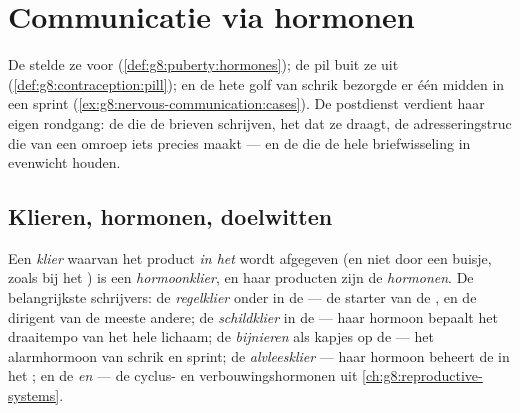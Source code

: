 \chapter{Communicatie via hormonen}\label{ch:g8:hormonal-communication}

De  stelde ze voor
(\cref{def:g8:puberty:hormones}); de pil buit ze uit
(\cref{def:g8:contraception:pill}); en de hete golf van schrik bezorgde er
één midden in een sprint
(\cref{ex:g8:nervous-communication:cases}). De postdienst verdient haar
eigen rondgang: de  die de brieven schrijven, het  dat ze
draagt, de adresseringstruc die van een omroep iets precies maakt --- en
de  die de hele briefwisseling in evenwicht houden.

\section{Klieren, hormonen, doelwitten}

\begin{definition}[De hormoonklieren]\label{def:g8:hormonal-communication:glands}
Een \emph{klier} waarvan het product \emph{in het }
wordt afgegeven (en niet door een buisje, zoals bij het ) is een
\emph{hormoonklier}, en haar producten zijn de
\emph{hormonen}. De belangrijkste schrijvers: de
\emph{regelklier} onder in de  --- de starter van de , en
de dirigent van de meeste andere; de \emph{schildklier} in de  ---
haar hormoon bepaalt het draaitempo van het hele lichaam; de
\emph{bijnieren} als kapjes op de  --- het alarmhormoon van schrik en
sprint; de \emph{alvleesklier} --- haar hormoon beheert de  in het
; en de \emph{ en } --- de cyclus- en
verbouwingshormonen uit \cref{ch:g8:reproductive-systems}.
\end{definition}


